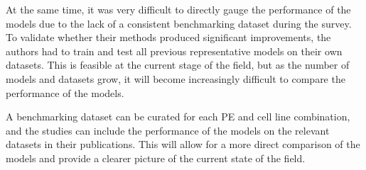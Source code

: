 \documentclass[12pt]{article}
\begin{document}
At the same time, it was very difficult to directly gauge the performance of the models due to the lack of a consistent benchmarking dataset during the survey. To validate whether their methods produced significant improvements, the authors had to train and test all previous representative models on their own datasets. This is feasible at the current stage of the field, but as the number of models and datasets grow, it will become increasingly difficult to compare the performance of the models. 

A benchmarking dataset can be curated for each PE and cell line combination, and the studies can include the performance of the models on the relevant datasets in their publications. This will allow for a more direct comparison of the models and provide a clearer picture of the current state of the field.


\newpage

\printbibliography
\end{document}
